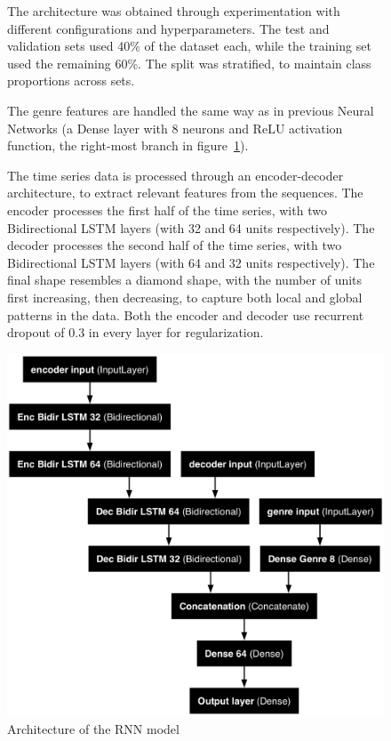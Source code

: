 \begin{figure}[H]

    \begin{minipage}{0.49\textwidth}
        The architecture was obtained through experimentation with
        different configurations and hyperparameters.
        The test and validation sets used 40\% of the dataset each,
        while the training set used the remaining 60\%.
        The split was stratified, to maintain class proportions across sets.

        The genre features are handled the same way as in previous Neural
        Networks (a Dense layer with 8 neurons and ReLU activation function,
        the right-most branch in figure~\ref{fig:rnn_model}).

        The time series data is processed through an encoder-decoder
        architecture, to extract relevant features from the sequences.
        The encoder processes the first half of the time series,
        with two Bidirectional LSTM layers (with 32 and 64 units respectively).
        The decoder processes the second half of the time series,
        with two Bidirectional LSTM layers (with 64 and 32 units respectively).
        The final shape resembles a diamond shape, with the number of units
        first increasing, then decreasing, to capture both local and global
        patterns in the data.
        Both the encoder and decoder use recurrent dropout of 0.3 in every layer
        for regularization.
    \end{minipage}
    \hfill
    \begin{minipage}{0.48\textwidth}
        \includegraphics[width=1\textwidth]{plotsss/rnn_model.png}
        \caption{Architecture of the RNN model}
        \label{fig:rnn_model}
    \end{minipage}
\end{figure}




